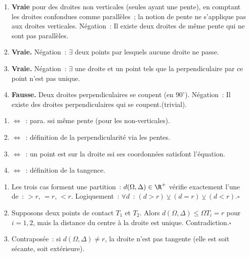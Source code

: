 
\begin{enumerate}
  \item \textbf{Vraie} pour des droites non verticales (seules ayant une pente), en comptant les droites confondues comme parall\`eles~;
        la notion de pente ne s'applique pas aux droites verticales.
        N\'egation~: \og Il existe deux droites de m\^eme pente qui ne sont pas parall\`eles.\fg
  \item \textbf{Vraie.} N\'egation~: \og $\exists$ deux points par lesquels aucune droite ne passe.\fg
  \item \textbf{Vraie.} N\'egation~: \og $\exists$ une droite et un point tels que la perpendiculaire
        par ce point n'est pas unique.\fg
  \item \textbf{Fausse.} Deux droites perpendiculaires se coupent (en $90^{\circ}$).
        N\'egation~: \og Il existe des droites perpendiculaires qui se coupent.\fg (trivial).
\end{enumerate}


\begin{enumerate}
  \item $\Leftrightarrow$~: para. ssi m\^eme pente (pour les non-verticales).
  \item $\Leftrightarrow$~: d\'efinition de la perpendicularit\'e via les pentes.
  \item $\Leftrightarrow$~: un point est sur la droite ssi ses coordonn\'ees satisfont l'\'equation.
  \item $\Leftrightarrow$~: d\'efinition de la tangence.
\end{enumerate}


\begin{enumerate}
  \item Les trois cas forment une partition~: $d(\Omega,\Delta)\in\R^+$ v\'erifie
        exactement l'une de~: $>r$, $=r$, $<r$. Logiquement~:
        $\forall d$~: $(d>r)\veebar(d=r)\veebar(d<r)$.\hfill$\square$
  \item Supposons deux points de contact $T_1$ et $T_2$. Alors $d(\Omega,\Delta)\leq\Omega T_i=r$
        pour $i=1,2$, mais la distance du centre \`a la droite est unique. Contradiction.\hfill$\square$
  \item Contrapos\'ee~: si $d(\Omega,\Delta)\ne r$, la droite n'est pas tangente
        (elle est soit s\'ecante, soit ext\'erieure).
\end{enumerate}

